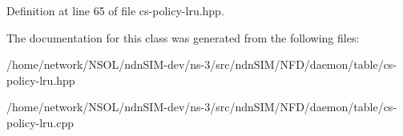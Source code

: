 Definition at line 65 of file cs-\/policy-\/lru.\+hpp.



The documentation for this class was generated from the following files\+:\begin{DoxyCompactItemize}
\item 
/home/network/\+N\+S\+O\+L/ndn\+S\+I\+M-\/dev/ns-\/3/src/ndn\+S\+I\+M/\+N\+F\+D/daemon/table/cs-\/policy-\/lru.\+hpp\item 
/home/network/\+N\+S\+O\+L/ndn\+S\+I\+M-\/dev/ns-\/3/src/ndn\+S\+I\+M/\+N\+F\+D/daemon/table/cs-\/policy-\/lru.\+cpp\end{DoxyCompactItemize}
